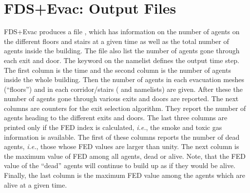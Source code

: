 \documentclass[12pt,a4paper,final,twoside]{stylevk}
\begin{document}
\section{FDS+Evac: Output Files}\label{Sec_OutFiles}

\noindent FDS+Evac produces a file , which has
information on the number of agents on the different floors and stairs
at a given time as well as the total number of agents inside the
building.  The file also list the number of agents gone through each
exit and door.  The keyword  on the 
namelist defines the output time step.  The first column is the time
and the second column is the number of agents inside the whole
building.  Then the number of agents in each evacuation meshes
(``floors'') and in each corridor/stairs ( and
 namelists) are given.  After these the number of agents
gone through various exits and doors are reported.  The next columns
are counters for the exit selection algorithm.  They report the number
of agents heading to the different exits and doors.  The last three
columns are printed only if the FED index is calculated, \emph{i.e.},
the smoke and toxic gas information is available.  The first of these
columns reports the number of dead agents, \emph{i.e.}, those whose
FED values are larger than unity.  The next column is the maximum
value of FED among all agents, dead or alive.  Note, that the FED
value of the ``dead'' agents will continue to build up as if they
would be alive.  Finally, the last column is the maximum FED value
among the agents which are alive at a given time.
\end{document}
